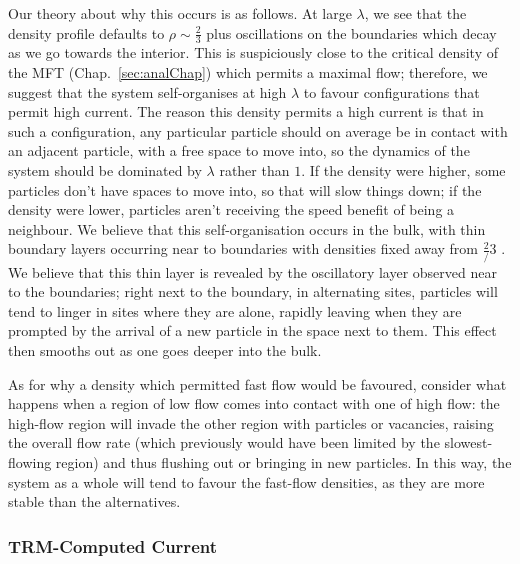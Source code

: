  Our theory about why this occurs is as follows.
 At large 
 $\lambda$, we see that the density profile defaults to $\rho\sim\frac{2}{3}$ plus oscillations on the 
 boundaries which decay as we go towards the interior. This is suspiciously close to the critical density
 of the MFT (Chap.~\ref{sec:analChap}) which permits a maximal flow; therefore, we suggest that the system
 self-organises at high $\lambda$ to favour configurations that permit high current. The reason this density permits a high current is that in such a configuration,
 any particular particle should on average be in contact with an adjacent particle, with a free space to move into, so the dynamics of the system should be dominated by $\lambda$ rather than $1$. If the density were
 higher, some particles don't have spaces to move into, so that will slow things down; if the density were 
 lower, particles aren't receiving the speed benefit of being a neighbour. We believe that this 
 self-organisation occurs in the bulk, with thin boundary layers occurring near to boundaries
 with densities fixed away from $\frac{2}/{3}$ .
 We believe that this thin layer is revealed by the oscillatory layer observed near to the boundaries; right next to the boundary, in alternating sites, particles will tend to
 linger in sites where they are alone, rapidly leaving when they are prompted by the arrival of a new particle in 
 the  space next to them. This effect then smooths out as one goes deeper into the bulk.
 
 As for why a density which permitted fast flow would be favoured, consider what happens when a 
 region of low flow comes into contact with one of high flow: the high-flow region will invade the
 other region with particles or vacancies, raising the overall flow rate (which previously would
 have been limited by the slowest-flowing region) and thus flushing out or bringing in new 
 particles. In this way, the system as a whole will tend to favour the fast-flow densities, as
 they are more stable than the alternatives.
 
 \subsubsection{TRM-Computed Current}

